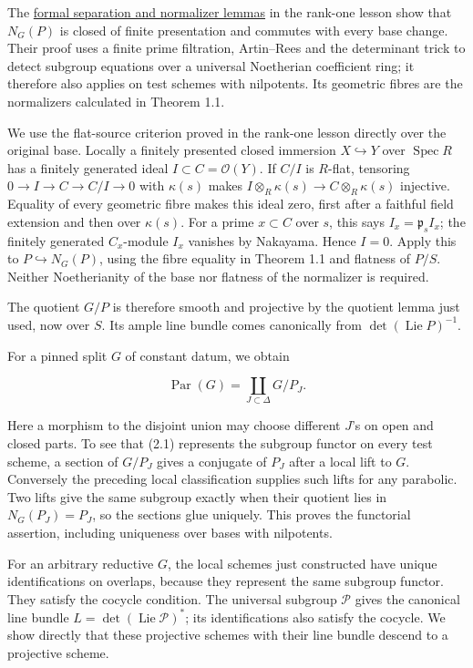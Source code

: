 \documentclass[11pt,a4paper,openany]{report}
\begin{document}
The \href{https://github.com/KokunoYumeto/open-math-courses/blob/main/docs/courses/AG-RG/AG-RG-03.md\#formal-separation-and-normalizers}{formal separation and normalizer lemmas} in the rank-one lesson show that \(N_G(P)\) is closed of finite presentation and commutes with every base change. Their proof uses a finite prime filtration, Artin--Rees and the determinant trick to detect subgroup equations over a universal Noetherian coefficient ring; it therefore also applies on test schemes with nilpotents. Its geometric fibres are the normalizers calculated in Theorem 1.1.

We use the flat-source criterion proved in the rank-one lesson directly over the original base. Locally a finitely presented closed immersion \(X\hookrightarrow Y\) over \(\operatorname{Spec}R\) has a finitely generated ideal \(I\subset C=\mathcal O(Y)\). If \(C/I\) is \(R\)-flat, tensoring \(0\to I\to C\to C/I\to0\) with \(\kappa(s)\) makes \(I\otimes_R\kappa(s)\to C\otimes_R\kappa(s)\) injective. Equality of every geometric fibre makes this ideal zero, first after a faithful field extension and then over \(\kappa(s)\). For a prime \(x\subset C\) over \(s\), this says \(I_x=\mathfrak p_sI_x\); the finitely generated \(C_x\)-module \(I_x\) vanishes by Nakayama. Hence \(I=0\). Apply this to \(P\hookrightarrow N_G(P)\), using the fibre equality in Theorem 1.1 and flatness of \(P/S\). Neither Noetherianity of the base nor flatness of the normalizer is required.

The quotient \(G/P\) is therefore smooth and projective by the quotient lemma just used, now over \(S\). Its ample line bundle comes canonically from \(\det(\operatorname{Lie}P)^{-1}\).

For a pinned split \(G\) of constant datum, we obtain

\[
\operatorname{Par}(G)=\coprod_{J\subset\Delta}G/P_J.
\tag{2.1}
\]

Here a morphism to the disjoint union may choose different \(J\)'s on open and closed parts. To see that (2.1) represents the subgroup functor on every test scheme, a section of \(G/P_J\) gives a conjugate of \(P_J\) after a local lift to \(G\). Conversely the preceding local classification supplies such lifts for any parabolic. Two lifts give the same subgroup exactly when their quotient lies in \(N_G(P_J)=P_J\), so the sections glue uniquely. This proves the functorial assertion, including uniqueness over bases with nilpotents.

For an arbitrary reductive \(G\), the local schemes just constructed have unique identifications on overlaps, because they represent the same subgroup functor. They satisfy the cocycle condition. The universal subgroup \(\mathcal P\) gives the canonical line bundle \(L=\det(\operatorname{Lie}\mathcal P)^*\); its identifications also satisfy the cocycle. We show directly that these projective schemes with their line bundle descend to a projective scheme.
\end{document}
